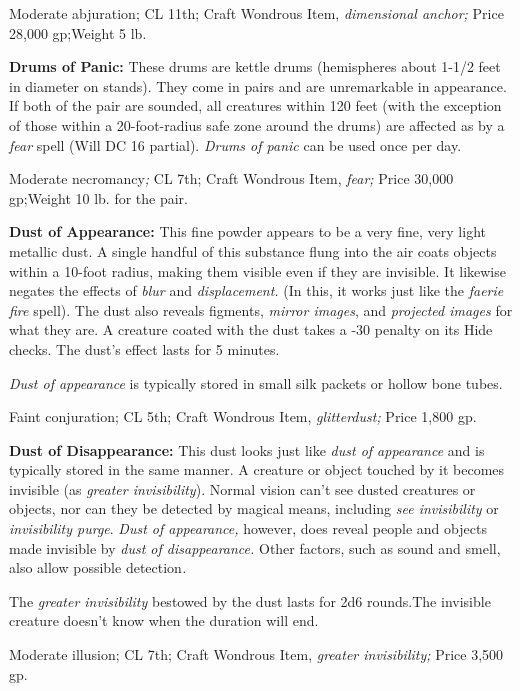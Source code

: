 Moderate abjuration; CL 11th; Craft Wondrous Item, \textit{dimensional anchor; 
}Price 28,000 gp;Weight 5 lb.

\textbf{Drums of Panic: }These drums are kettle drums (hemispheres about 1-1/2 
feet in diameter on stands). They come in pairs and are unremarkable in appearance. 
If both of the pair are sounded, all creatures within 120 feet (with the exception 
of those within a 20-foot-radius safe zone around the drums) are affected as by 
a \textit{fear }spell (Will DC 16 partial). \textit{Drums of panic }can be used 
once per day.

Moderate necromancy\textit{; }CL 7th; Craft Wondrous Item, \textit{fear; }Price 
30,000 gp;Weight 10 lb. for the pair.

\textbf{Dust of Appearance:} This fine powder appears to be a very fine, very light 
metallic dust. A single handful of this substance flung into the air coats objects 
within a 10-foot radius, making them visible even if they are invisible. It likewise 
negates the effects of \textit{blur }and \textit{displacement. }(In this, it works 
just like the \textit{faerie fire }spell). The dust also reveals figments, \textit{mirror 
images}, and \textit{projected images }for what they are. A creature coated with 
the dust takes a -30 penalty on its Hide checks. The dust's effect lasts for 5 
minutes.

\textit{Dust of appearance }is typically stored in small silk packets or hollow 
bone tubes.

Faint conjuration; CL 5th; Craft Wondrous Item, \textit{glitterdust; }Price 1,800 
gp.

\textbf{Dust of Disappearance:} This dust looks just like \textit{dust of appearance 
}and is typically stored in the same manner. A creature or object touched by it 
becomes invisible (as \textit{greater invisibility}). Normal vision can't see dusted 
creatures or objects, nor can they be detected by magical means, including \textit{see 
invisibility }or \textit{invisibility purge}. \textit{Dust of appearance, }however, 
does reveal people and objects made invisible by \textit{dust of disappearance. 
}Other factors, such as sound and smell, also allow possible detection\textit{.}

The \textit{greater invisibility }bestowed by the dust lasts for 2d6 rounds.The 
invisible creature doesn't know when the duration will end.

Moderate illusion; CL 7th; Craft Wondrous Item, \textit{greater invisibility; }Price 
3,500 gp.

